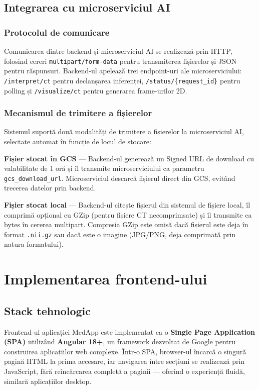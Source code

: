 \documentclass[12pt, a4paper]{report}
\begin{document}
\subsection{Integrarea cu microserviciul AI}
\subsubsection{Protocolul de comunicare}

Comunicarea dintre backend și microserviciul AI se realizează prin HTTP,
folosind cereri \texttt{multipart/form-data} pentru transmiterea fișierelor
și JSON pentru răspunsuri. Backend-ul apelează trei endpoint-uri ale
microserviciului: \texttt{/interpret/ct} pentru declanșarea inferenței,
\texttt{/status/\{request\_id\}} pentru polling și \texttt{/visualize/ct}
pentru generarea frame-urilor 2D.

\subsubsection{Mecanismul de trimitere a fișierelor}

Sistemul suportă două modalități de trimitere a fișierelor la microserviciul AI,
selectate automat în funcție de locul de stocare:

\textbf{Fișier stocat în GCS} --- Backend-ul generează un Signed URL de download cu
valabilitate de 1 oră și îl transmite microserviciului ca parametru
\texttt{gcs\_download\_url}. Microserviciul descarcă fișierul direct din GCS, evitând
trecerea datelor prin backend.

\textbf{Fișier stocat local} --- Backend-ul citește fișierul din sistemul de fișiere
local, îl comprimă opțional cu GZip (pentru fișiere CT necomprimsate) și îl transmite
ca bytes în cererea multipart. Compresia GZip este omisă dacă fișierul este deja în
format \texttt{.nii.gz} sau dacă este o imagine (JPG/PNG, deja comprimată prin natura
formatului).

\section{Implementarea frontend-ului}

\subsection{Stack tehnologic}

Frontend-ul aplicației MedApp este implementat ca o \textbf{Single Page Application
(SPA)} utilizând \textbf{Angular 18+}, un framework dezvoltat de Google pentru
construirea aplicațiilor web complexe. Într-o SPA, browser-ul încarcă o singură
pagină HTML la prima accesare, iar navigarea între secțiuni se realizează prin
JavaScript, fără reîncărcarea completă a paginii --- oferind o experiență fluidă,
similară aplicațiilor desktop.
\end{document}
